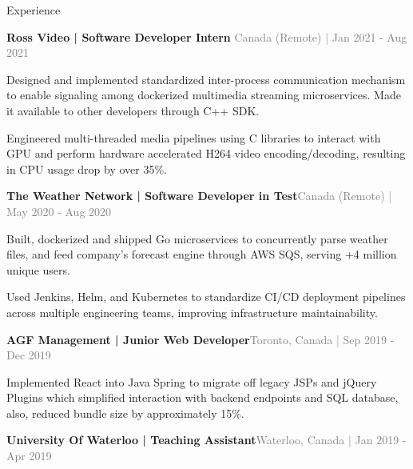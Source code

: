 \documentclass[hidelinks]{resume} %
\begin{document}
\begin{rSection}{Experience}
\begin{rSubsection}{\textbf{Ross Video | Software Developer Intern} }{\textcolor{gray}{\small Canada (Remote) | Jan 2021 - Aug 2021}}{}
    \begin{bulletpoints}
        \vspace{-.07cm}
        \item Designed and implemented standardized inter-process communication mechanism to enable signaling among dockerized multimedia streaming microservices. Made it available to other developers through C++ SDK.
        \vspace{-.13cm}
        \item Engineered multi-threaded media pipelines using C libraries to interact with GPU and perform hardware accelerated H264 video encoding/decoding, resulting in CPU usage drop by over 35\%.
        \vspace{-.13cm}
    \end{bulletpoints}
\end{rSubsection}
\begin{rSubsection}{\textbf{The Weather Network | Software Developer in Test}}{\textcolor{gray}{\small Canada (Remote) | May 2020 - Aug 2020}}{}

        \begin{bulletpoints}
            \vspace{-.07cm}
            \item Built, dockerized and shipped Go microservices to concurrently parse weather files, and feed company's forecast engine through AWS SQS, serving +4 million unique users.
            \vspace{-.13cm}
             \item Used Jenkins, Helm, and Kubernetes to standardize CI/CD deployment pipelines across multiple engineering teams, improving infrastructure maintainability.
             \vspace{-.13cm}
        \end{bulletpoints}
\end{rSubsection}
\begin{rSubsection}{\textbf{AGF Management | Junior Web Developer}}{\textcolor{gray}{\small Toronto, Canada | Sep 2019 - Dec 2019}}{}
        \par
        \begin{bulletpoints}
            \vspace{-.07cm}
            \item Implemented React into Java Spring to migrate off legacy JSPs and jQuery Plugins which simplified interaction with backend endpoints and SQL database, also, reduced bundle size by approximately 15\%.
             \vspace{-.13cm}
        \end{bulletpoints}
\end{rSubsection}
\begin{rSubsection}{\textbf{University Of Waterloo | Teaching Assistant}}{\textcolor{gray}{\small Waterloo, Canada | Jan 2019 - Apr 2019}}{}


\end{rSubsection}
\end{rSection}
\end{document}

